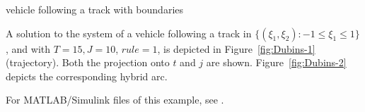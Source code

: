 \begin{example}{vehicle following a track with boundaries}







A solution to the system of a vehicle following a track in $\{(\xi_1,\xi_2):-1\leq \xi_1 \leq1\}$, and with
$T=15, J=10$, $rule =1$, is depicted in Figure~\ref{fig:Dubins-1} (trajectory).  Both the
projection onto $t$ and $j$ are shown. Figure~\ref{fig:Dubins-2} depicts the corresponding
hybrid arc.

For MATLAB/Simulink files of this example, see .

\end{example}

